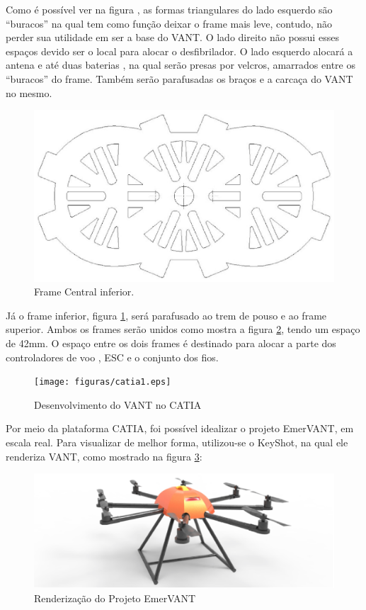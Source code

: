 Como é possível ver na figura \label{fig:drawinfinfo}, as formas triangulares do lado esquerdo são “buracos” na qual tem como função deixar o frame mais leve, contudo, não perder sua utilidade em ser a base do VANT. O lado direito não possui esses espaços devido ser o local para alocar o desfibrilador. O lado esquerdo alocará a antena e até duas baterias , na qual serão presas por velcros, amarrados entre os “buracos” do frame. Também serão parafusadas os braços e a carcaça do VANT no mesmo.

\begin{figure}[H]
    \centering
      \includegraphics[keepaspectratio=true,scale=0.5]{figuras/drawinfinfo.eps}
    \caption{ Frame Central inferior.}
    \label{fig:drawinfinfo}
\end{figure}

Já o frame inferior, figura \ref{fig:drawinfinfo}, será parafusado ao trem de pouso e ao frame superior.  Ambos os frames serão unidos como mostra a figura \ref{fig:catia1}, tendo um espaço de 42mm. O espaço entre os dois frames é destinado para alocar a parte dos controladores de voo , ESC e o conjunto dos fios.

\begin{figure}[H]
    \centering
      \texttt{[image: figuras/catia1.eps]}
    \caption{Desenvolvimento do VANT no CATIA}
    \label{fig:catia1}
\end{figure}

Por meio da plataforma CATIA, foi possível idealizar o projeto EmerVANT, em escala real. Para visualizar de melhor forma, utilizou-se o KeyShot, na qual ele renderiza VANT, como mostrado na figura \ref{fig:keyshot1}:

\begin{figure}[H]
    \centering
      \includegraphics[keepaspectratio=true,scale=0.5]{figuras/keyshot1.eps}
    \caption{ Renderização do Projeto EmerVANT}
    \label{fig:keyshot1}
\end{figure}

